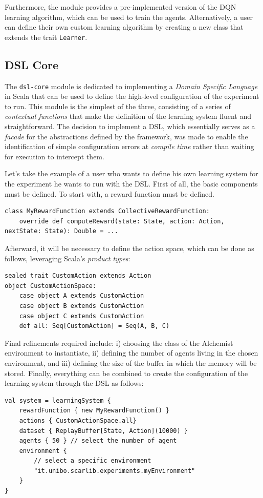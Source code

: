 \documentclass[12pt,a4paper,openright,twoside]{book}
\begin{document}
Furthermore, the module provides a pre-implemented version of the DQN \cite{dqn} learning algorithm, which can be used 
    to train the agents. Alternatively, a user can define their own custom learning algorithm by creating a
    new class that extends the trait \texttt{Learner}.

\subsection*{DSL Core}
The \texttt{dsl-core} module is dedicated to implementing a \emph{Domain Specific Language} in Scala that can be used to 
    define the high-level configuration of the experiment to run. This module is the simplest of the three, 
    consisting of a series of \emph{contextual functions} that make the definition of the learning system 
    fluent and straightforward.
    The decision to implement a DSL, which essentially serves as a \emph{facade} for the abstractions defined 
    by the framework, was made to enable the identification of simple configuration errors at \emph{compile time} rather than waiting
    for execution to intercept them.

Let's take the example of a user who wants to define his own learning system for the experiment he wants to run 
    with the DSL. First of all, the basic components must be defined. To start with, a reward 
    function must be defined.
    \begin{lstlisting}
class MyRewardFunction extends CollectiveRewardFunction:
    override def computeReward(state: State, action: Action, nextState: State): Double = ...
    \end{lstlisting}
    Afterward, it will be necessary to define the action space, which can be done as follows, 
    leveraging Scala's \emph{product types}:
    \begin{lstlisting}
sealed trait CustomAction extends Action
object CustomActionSpace:
    case object A extends CustomAction
    case object B extends CustomAction
    case object C extends CustomAction
    def all: Seq[CustomAction] = Seq(A, B, C)
    \end{lstlisting}
Final refinements required include: 
    i) choosing the class of the Alchemist environment to instantiate, 
    ii) defining the number of agents living in the chosen environment, and 
    iii) defining the size of the buffer in which the memory will be stored.
    Finally, everything can be combined to create the configuration of the learning system through the DSL 
    as follows:
    \begin{lstlisting}
val system = learningSystem {
    rewardFunction { new MyRewardFunction() }
    actions { CustomActionSpace.all}
    dataset { ReplayBuffer[State, Action](10000) }
    agents { 50 } // select the number of agent
    environment {
        // select a specific environment
        "it.unibo.scarlib.experiments.myEnvironment"
    }
}
    \end{lstlisting}
\end{document}

